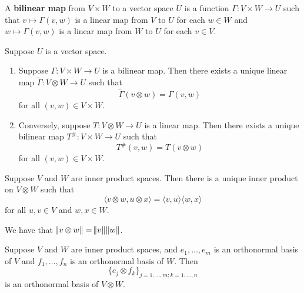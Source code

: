 \documentclass{extarticle}
\begin{document}
\begin{definition}
    A \textbf{bilinear map} from \(V \times W\) to a vector space \(U\) is a function 
    \(\Gamma \colon V \times W \to U\) such that \(v \mapsto \Gamma(v, w)\) is a linear map 
    from \(V\) to \(U\) for each \(w \in W\) and \(w \mapsto \Gamma(v, w)\) is a linear map 
    from \(W\) to \(U\) for each \(v \in V\).
\end{definition}

\begin{lemma}
    Suppose \(U\) is a vector space. 

    \begin{enumerate}[label=(\alph*)]
        \item Suppose \(\Gamma \colon V \times W \to U\) is a bilinear map. Then there exists 
        a unique linear map \(\tilde{\Gamma} \colon V \otimes W \to U\) such that 
        \[\tilde{\Gamma} (v \otimes w) = \Gamma(v, w)\]
        for all \((v, w) \in V \times W\).
        
        \item Conversely, suppose \(T \colon V \otimes W \to U\) is a linear map. Then there 
        exists a unique bilinear map \(T^{\#} \colon V \times W \to U\) such that 
        \[T^{\#} (v, w) = T(v \otimes w)\]
        for all \((v, w) \in V \times W\).
    \end{enumerate}
\end{lemma}

\begin{thm}
    Suppose \(V\) and \(W\) are inner product spaces. Then there is a unique inner product 
    on \(V \otimes W\) such that 
    \[\langle v \otimes w, u \otimes x \rangle = \langle v,u \rangle \langle w,x \rangle\]
    for all \(u, v \in V\) and \(w, x \in W\).
\end{thm}

\begin{remark}
    We have that \(\norm{v \otimes w} = \norm{v} \norm{w}\).
\end{remark}

\begin{corollary}
    Suppose \(V\) and \(W\) are inner product spaces, and \(e_1, \ldots, e_m\) is an orthonormal 
    basis of \(V\) and \(f_1, \ldots, f_n\) is an orthonormal basis of \(W\). Then 
    \[ \{e_j \otimes f_k\}_{j = 1, \ldots, m;k=1, \ldots, n}\]
    is an orthonormal basis of \(V \otimes W\).
\end{corollary}
\end{document}
